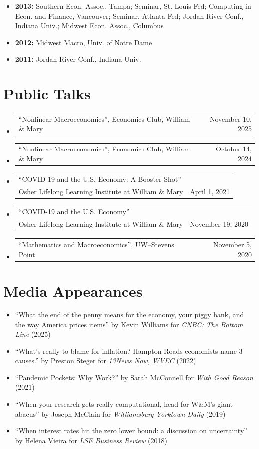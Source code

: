 \documentclass[10pt,letterpaper,en-US]{article}
\makeatletter
\newcommand{\itemrow}[2]
{\begin{tabular*}{\linewidth}{l@{\extracolsep{\fill}}r}
	#1 & #2 \\
\end{tabular*}}
\makeatother
\begin{document}
\begin{itemize}
\item \textbf{2013:} Southern Econ. Assoc., Tampa; Seminar, St. Louis Fed; Computing in Econ. and Finance, Vancouver; Seminar, Atlanta Fed; Jordan River Conf., Indiana Univ.; Midwest Econ. Assoc., Columbus
\item \textbf{2012:} Midwest Macro, Univ. of Notre Dame
\item \textbf{2011:} Jordan River Conf., Indiana Univ.
\end{itemize}

\section*{Public Talks}
\begin{itemize}
    \item \itemrow{``Nonlinear Macroeconomics'', Economics Club, William \& Mary}{November 10, 2025}
    \item \itemrow{``Nonlinear Macroeconomics'', Economics Club, William \& Mary}{October 14, 2024}
    \item \itemrow{``COVID-19 and the U.S. Economy: A Booster Shot'' \\ Osher Lifelong Learning Institute at William \& Mary}{April 1, 2021}
    \item \itemrow{``COVID-19 and the U.S. Economy'' \\ Osher Lifelong Learning Institute at William \& Mary}{November 19, 2020}
    \item \itemrow{``Mathematics and Macroeconomics'', UW--Stevens Point}{November 5, 2020}
\end{itemize}

\newpage
\section*{Media Appearances}
\begin{itemize}
    \item ``What the end of the penny means for the economy, your piggy bank, and the way America prices items'' by Kevin Williams for \emph{CNBC: The Bottom Line} (2025) 
    \item ``What's really to blame for inflation? Hampton Roads economists name 3 causes.'' by Preston Steger for \emph{13News Now, WVEC} (2022)
    \item ``Pandemic Pockets: Why Work{?}'' by Sarah McConnell for \emph{With Good Reason} (2021)
    \item ``When your research gets really computational, head for W\&M’s giant abacus'' by Joseph McClain for \emph{Williamsburg Yorktown Daily} (2019)
    \item ``When interest rates hit the zero lower bound: a discussion on uncertainty'' by Helena Vieira for \emph{LSE Business Review} (2018)
\end{itemize}
\end{document}
